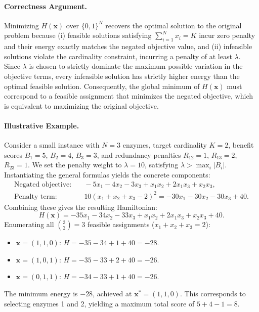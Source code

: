 \documentclass[12pt]{article}
\begin{document}
\paragraph{Correctness Argument.}
Minimizing $H(\mathbf{x})$ over $\{0,1\}^N$ recovers the optimal solution to the original problem because (i) feasible solutions satisfying $\sum_{i=1}^N x_i = K$ incur zero penalty and their energy exactly matches the negated objective value, and (ii) infeasible solutions violate the cardinality constraint, incurring a penalty of at least $\lambda$. Since $\lambda$ is chosen to strictly dominate the maximum possible variation in the objective terms, every infeasible solution has strictly higher energy than the optimal feasible solution. Consequently, the global minimum of $H(\mathbf{x})$ must correspond to a feasible assignment that minimizes the negated objective, which is equivalent to maximizing the original objective.

\paragraph{Illustrative Example.}
Consider a small instance with $N = 3$ enzymes, target cardinality $K = 2$, benefit scores $B_1 = 5$, $B_2 = 4$, $B_3 = 3$, and redundancy penalties $R_{12} = 1$, $R_{13} = 2$, $R_{23} = 1$. We set the penalty weight to $\lambda = 10$, satisfying $\lambda > \max_i |B_i|$. Instantiating the general formulas yields the concrete components:
\begin{align}
  \text{Negated objective:} & \quad -5x_1 - 4x_2 - 3x_3 + x_1x_2 + 2x_1x_3 + x_2x_3, \\
  \text{Penalty term:} & \quad 10(x_1 + x_2 + x_3 - 2)^2 = -30x_1 - 30x_2 - 30x_3 + 40.
\end{align}
Combining these gives the resulting Hamiltonian:
\begin{equation}
  H(\mathbf{x}) = -35x_1 - 34x_2 - 33x_3 + x_1x_2 + 2x_1x_3 + x_2x_3 + 40.
\end{equation}
Enumerating all $\binom{3}{2} = 3$ feasible assignments ($x_1+x_2+x_3=2$):
\begin{itemize}
  \item $\mathbf{x} = (1,1,0)$: $H = -35 - 34 + 1 + 40 = -28$.
  \item $\mathbf{x} = (1,0,1)$: $H = -35 - 33 + 2 + 40 = -26$.
  \item $\mathbf{x} = (0,1,1)$: $H = -34 - 33 + 1 + 40 = -26$.
\end{itemize}
The minimum energy is $-28$, achieved at $\mathbf{x}^* = (1,1,0)$. This corresponds to selecting enzymes 1 and 2, yielding a maximum total score of $5 + 4 - 1 = 8$.
\end{document}
